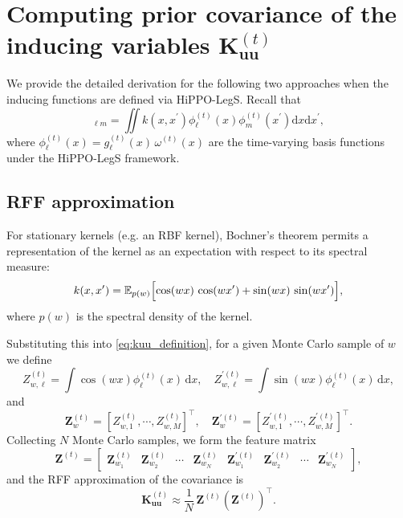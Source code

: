 \section{Computing prior covariance of the inducing variables \(\mathbf{K}_{\mathbf{uu}}^{(t)}\)}
We provide the detailed derivation for the following two approaches when the inducing functions are defined via HiPPO-LegS. Recall that
\begin{equation}
[\mathbf{K}_{\mathbf{uu}}^{(t)}]_{\ell m}
=
\iint
k(x, x^{\prime}) \phi_{\ell}^{(t)}(x)\phi_{m}^{(t)}(x^{\prime}) \mathrm{d}x \mathrm{d}x^{\prime},
\label{eq:kuu_definition}
\end{equation}
where $\phi_{\ell}^{(t)}(x) = g_{\ell}^{(t)}(x)\,\omega^{(t)}(x)$ are the time-varying basis functions under the HiPPO-LegS framework.

\subsection{RFF approximation}
\label{appendix:rff}
For stationary kernels (e.g. an RBF kernel), Bochner's theorem permits a representation of the kernel as an expectation with respect to its spectral measure:
\begin{equation}
   k(x,x^{\prime}) = \mathbb{E}_{p(w)}\Bigl[\cos(wx)\,\cos(wx^{\prime}) +\sin(wx)\,\sin(wx^{\prime})\Bigr],
\end{equation}
where \( p(w) \) is the spectral density of the kernel.

Substituting this into \eqref{eq:kuu_definition}, for a given Monte Carlo sample of \( w \) we define
\begin{equation}
    Z_{w,\ell}^{(t)} = \int \cos(wx)\phi_{\ell}^{(t)}(x)\,\mathrm{d}x, \quad Z_{w,\ell}^{\prime(t)} = \int \sin(wx)\phi_{\ell}^{(t)}(x)\,\mathrm{d}x, 
\end{equation}
and
\begin{equation}
    \mathbf{Z}_{w}^{(t)} = \left[Z_{w,1}^{(t)},  \cdots, Z_{w,M}^{(t)}\right]^\intercal, \quad \mathbf{Z}_{w}^{\prime(t)} = \left[Z_{w,1}^{\prime(t)}, \cdots, Z_{w,M}^{\prime(t)}\right]^\intercal. 
\end{equation}
Collecting \(N\) Monte Carlo samples, we form the feature matrix
\begin{equation}
    \mathbf{Z}^{(t)} = \begin{bmatrix} \mathbf{Z}_{w_1}^{(t)} & 
    \mathbf{Z}_{w_2}^{(t)} & \cdots & 
    \mathbf{Z}_{w_N}^{(t)} & 
    \mathbf{Z}_{w_1}^{\prime(t)} & 
    \mathbf{Z}_{w_2}^{\prime(t)} & \cdots & 
    \mathbf{Z}_{w_N}^{\prime(t)} 
    \end{bmatrix},
\end{equation}
and the RFF approximation of the covariance is
\begin{equation}
    \mathbf{K}_{\mathbf{uu}}^{(t)} \approx \frac{1}{N}\,\mathbf{Z}^{(t)}\left(\mathbf{Z}^{(t)}\right)^\intercal.
\end{equation}


